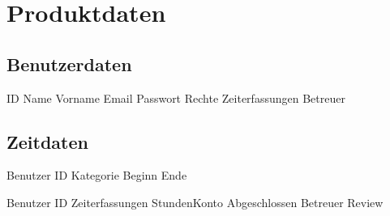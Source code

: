 \section{Produktdaten}

\subsection{Benutzerdaten}
\begin{requirements}
	\begin{requirements}
		 ID
		 Name
		 Vorname
		 Email
		 Passwort
		 Rechte
		 Zeiterfassungen
		 Betreuer
	\end{requirements}
\end{requirements}

\subsection{Zeitdaten}
\begin{requirements}
	\req [Zeiterfassung] {D20}
	\begin{requirements}
		 Benutzer ID
		 Kategorie
		 Beginn
		 Ende
	\end{requirements}

	\req [Stundenzettel] {D30}
	\begin{requirements}
		 Benutzer ID
		 Zeiterfassungen
		 StundenKonto
		 Abgeschlossen
		 Betreuer Review
	\end{requirements}
\end{requirements}


